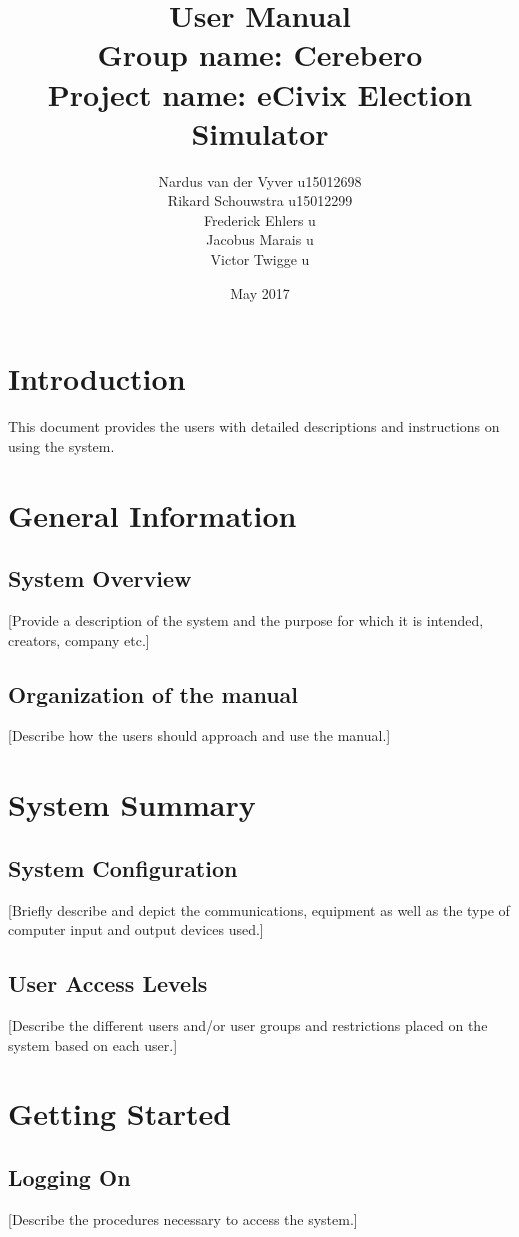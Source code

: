 \documentclass{article}
\title{\textbf{User Manual}\\
        \textbf{Group name:} Cerebero\\
       \textbf{ Project name:} eCivix Election Simulator}
\date{May 2017}
\author{Nardus van der Vyver u15012698 \\
          Rikard Schouwstra u15012299 \\
          Frederick Ehlers u \\
          Jacobus Marais u \\
          Victor Twigge u \\}
\begin{document}
  \maketitle

  \tableofcontents

  \section{Introduction}
      This document provides the users with detailed descriptions and instructions on using the system.

  \section{General Information}
    \subsection{System Overview}
    [Provide a description of the system and the purpose for which it is intended, creators, company etc.]
    \subsection{Organization of the manual}
    [Describe how the users should approach and use the manual.]
  
  \section{System Summary}
    \subsection{System Configuration}
    [Briefly describe and depict the communications, equipment as well as the type of computer input and output devices used.]
    \subsection{User Access Levels}
    [Describe the different users and/or user groups and restrictions placed on the system based on each user.]
    
  \section{Getting Started}
    \subsection{Logging On}
    [Describe the procedures necessary to access the system.]
\end{document}
